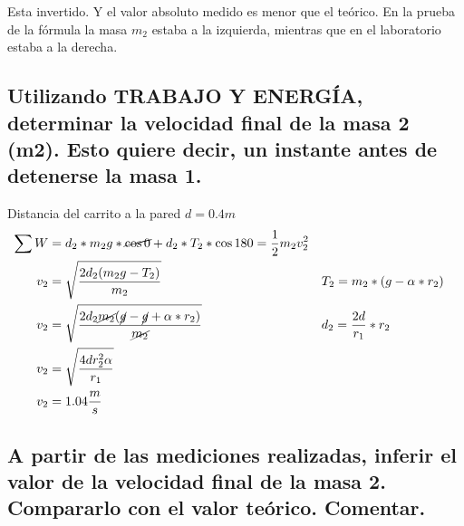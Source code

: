 \documentclass[12pt]{article}
\begin{document}
Esta invertido.
Y el valor absoluto medido es menor que el teórico.
En la prueba de la fórmula la masa $m_2$ estaba a la izquierda, mientras que en el laboratorio estaba a la derecha.

\subsection{Utilizando  TRABAJO  Y  ENERGÍA,
determinar  la  velocidad  final  de  la  masa  2 (m2).
Esto quiere decir, un instante antes de detenerse la masa 1.}%

Distancia del carrito a la pared $d=0.4m$
\begin{align*}
	\sum W &= d_2*m_2g*\cancel{\cos{0}} + d_2*T_2*\cos{180}= \frac{1}{2} m_2v_2^2\\
	v_2 &= \sqrt{\frac{2d_2(m_2g-T_2)}{m_2}}&&T_2 = m_2*(g-\alpha*r_2)\\
	v_2 &= \sqrt{\frac{2d_2\cancel{m_2}(\cancel{g}-\cancel{g}+\alpha*r_2)}{\cancel{m_2}}}&&d_2 =\frac{2d}{r_1}*r_2\\
	v_2 &= \sqrt{ \frac{4dr_2^2\alpha}{r_1} }\\
	v_2 &= 1.04 \frac{m}{s}
\end{align*}

\subsection{A partir de las mediciones realizadas,
inferir el valor de la velocidad final de la masa 2.
Compararlo con el valor teórico.
Comentar.}%
\end{document}
